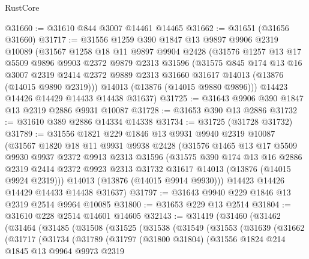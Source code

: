 \begin{lexlean}{RustCore}
\begin{coremodule}
@31660 := @31610 @844 @3007 @14461 @14465
@31662 := @31651 (@31656 @31660)
@31717 := @31556
    @1259
    @390
    @1847
    @13
    @9897
    @9906
    @2319
    @10089
    (@31567
      @1258
      @18
      @11
      @9897
      @9904
      @2428
      (@31576
        @1257
        @13
        @17
        @5509
        @9896
        @9903
        @2372
        @9879
        @2313
        @31596
        (@31575
          @845
          @174
          @13
          @16
          @3007
          @2319
          @2414
          @2372
          @9889
          @2313
          @31660
          @31617
          @14013
          (@13876 (@14015 @9890 @2319)))
        @14013
        (@13876 (@14015 @9880 @9896)))
      @14423
      @14426
      @14429
      @14433
      @14438
      @31637)
@31725 := @31643 @9906 @390 @1847 @13 @2319 @2886 @9931 @10087
@31728 := @31653 @390 @13 @2886
@31732 := @31610 @389 @2886 @14334 @14338
@31734 := @31725 (@31728 @31732)
@31789 := @31556
    @1821
    @229
    @1846
    @13
    @9931
    @9940
    @2319
    @10087
    (@31567
      @1820
      @18
      @11
      @9931
      @9938
      @2428
      (@31576
        @1465
        @13
        @17
        @5509
        @9930
        @9937
        @2372
        @9913
        @2313
        @31596
        (@31575
          @390
          @174
          @13
          @16
          @2886
          @2319
          @2414
          @2372
          @9923
          @2313
          @31732
          @31617
          @14013
          (@13876 (@14015 @9924 @2319)))
        @14013
        (@13876 (@14015 @9914 @9930)))
      @14423
      @14426
      @14429
      @14433
      @14438
      @31637)
@31797 := @31643 @9940 @229 @1846 @13 @2319 @2514 @9964 @10085
@31800 := @31653 @229 @13 @2514
@31804 := @31610 @228 @2514 @14601 @14605
@32143 := @31419
    (@31460
      (@31462
        (@31464
          (@31485
            (@31508
              (@31525
                (@31538
                  (@31549
                    (@31553
                      (@31639
                        (@31662
                          (@31717
                            (@31734
                              (@31789
                                (@31797
                                  (@31800 @31804)
                                  (@31556
                                    @1824
                                    @214
                                    @1845
                                    @13
                                    @9964
                                    @9973
                                    @2319

\end{coremodule}
\end{lexlean}
